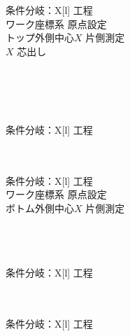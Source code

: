 \begin{multicollongtblr}{条件分岐：\PMTopOutcutExists}{X[l]}
工程\\
ワーク座標系 原点設定\\
トップ外側中心$X$ 片側測定\\
\KeywayCenter$X$ 芯出し\\
\TopOutcutMilling\\
\KeywayMilling\\
\TopEndFaceOutChamferMilling\\
\CenterlineEndFaceDifMeasurement\\
\end{multicollongtblr}

\begin{multicollongtblr}{条件分岐：\PMTopOutcutEndKeywayExists}{X[l]}
工程\\
\TopOutcutMilling\\
\TopCurvedOutcutMilling\\
\end{multicollongtblr}

\begin{multicollongtblr}{条件分岐：\PMBottomOutcutExists}{X[l]}
工程\\
ワーク座標系 原点設定\\
ボトム外側中心$X$ 片側測定\\
\BottomOutcutMilling\\
\BottomEndFaceOutChamferMilling\\
\CenterlineEndFaceDifMeasurement\\
\end{multicollongtblr}

\begin{multicollongtblr}{条件分岐：\PMSquareEndMillTaperExists}{X[l]}
工程\\
\OutcutMilling\\
\CurvedOutcutMilling\\
\end{multicollongtblr}

\begin{multicollongtblr}{条件分岐：\PMOutcutCenterReference}{X[l]}
工程\\
\CenterlineEndFaceDifMeasurement\\
\end{multicollongtblr}



